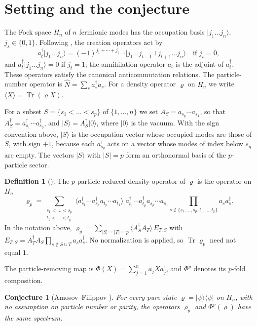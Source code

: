 \documentclass[11pt,a4paper]{article}
\newtheorem{conjecture}[theorem]{Conjecture}
\theoremstyle{definition}
\newtheorem{definition}[theorem]{Definition}
\theoremstyle{plain}
\DeclareMathOperator{\Tr}{Tr}
\newcommand{\ket}[1]{\lvert#1\rangle}
\newcommand{\bra}[1]{\langle#1\rvert}
\newcommand{\Nop}{\hat N}
\begin{document}
\section{Setting and the conjecture}\label{sec:setting}
The Fock space $H_n$ of $n$ fermionic modes has the occupation basis
$\ket{j_1\dots j_n}$, $j_s\in\{0,1\}$. Following \cite{AmosovFilippov2017},
the creation operators act by
\[
a_t^\dagger\ket{j_1\dots j_n}=(-1)^{j_1+\cdots+j_{t-1}}
\ket{j_1\dots j_{t-1}\,1\,j_{t+1}\dots j_n}\quad\text{if } j_t=0,
\]
and $a_t^\dagger\ket{j_1\dots j_n}=0$ if $j_t=1$; the annihilation operator
$a_t$ is the adjoint of $a_t^\dagger$. These operators satisfy the canonical
anticommutation relations. The particle-number operator is
$\Nop=\sum_s a_s^\dagger a_s$. For a density operator $\varrho$ on $H_n$ we
write $\langle X\rangle=\Tr(\varrho X)$.

For a subset $S=\{s_1<\dots<s_p\}$ of $\{1,\dots,n\}$ we set
$A_S=a_{s_p}\cdots a_{s_1}$, so that
$A_S^\dagger=a_{s_1}^\dagger\cdots a_{s_p}^\dagger$, and
$\ket{S}=A_S^\dagger\ket{0}$, where $\ket0$ is the vacuum. With the sign
convention above, $\ket S$ is the occupation vector whose occupied modes are
those of $S$, with sign $+1$, because each $a_{s_q}^\dagger$ acts on a vector
whose modes of index below $s_q$ are empty. The vectors $\ket S$ with $|S|=p$
form an orthonormal basis of the $p$-particle sector.

\begin{definition}[\cite{AmosovFilippov2017}]\label{def:rdm}
The $p$-particle reduced density operator of $\varrho$ is the operator on
$H_n$
\[
\varrho_p=\sum_{\substack{s_1<\dots<s_p\\ t_1<\dots<t_p}}
\langle a_{s_1}^\dagger\cdots a_{s_p}^\dagger a_{t_p}\cdots a_{t_1}\rangle\;
a_{t_1}^\dagger\cdots a_{t_p}^\dagger a_{s_p}\cdots a_{s_1}
\prod_{s\notin\{s_1,\dots,s_p,t_1,\dots,t_p\}}a_sa_s^\dagger .
\]
In the notation above,
$\varrho_p=\sum_{|S|=|T|=p}\langle A_S^\dagger A_T\rangle\,E_{T,S}$ with
$E_{T,S}=A_T^\dagger A_S\prod_{s\notin S\cup T}a_sa_s^\dagger$. No
normalization is applied, so $\Tr\varrho_p$ need not equal $1$.
\end{definition}

The particle-removing map is $\Phi(X)=\sum_{j=1}^n a_jXa_j^\dagger$, and
$\Phi^p$ denotes its $p$-fold composition.

\begin{conjecture}[Amosov--Filippov \cite{AmosovFilippov2017}]
For every pure state $\varrho=\ket\psi\bra\psi$ on $H_n$, with no assumption
on particle number or parity, the operators $\varrho_p$ and $\Phi^p(\varrho)$
have the same spectrum.
\end{conjecture}
\end{document}
